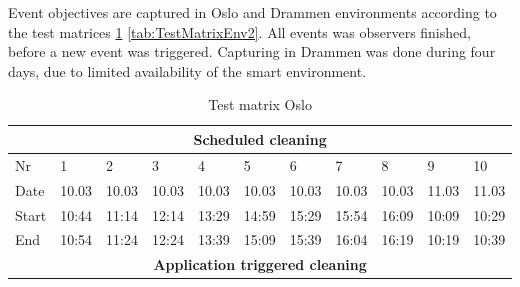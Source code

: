 Event objectives are captured in Oslo and Drammen environments according to the test matrices \ref{tab:TestMatrixEnv1} \ref{tab:TestMatrixEnv2}. All events was observers finished, before a new event was triggered. Capturing in Drammen was done during four days, due to limited availability of the smart environment.  
\begin{table}[H]
\centering
\small
\caption{Test matrix Oslo}
\label{tab:TestMatrixEnv1}
\begin{tabular}{|lllllllllll|}
\hline
\multicolumn{11}{|c|}{\textbf{Scheduled cleaning}}                                                                                                                                                                                                                                                        \\ \hline
\multicolumn{1}{|l|}{Nr} & \multicolumn{1}{l|}{1}     & \multicolumn{1}{l|}{2}     & \multicolumn{1}{l|}{3}     & \multicolumn{1}{l|}{4}     & \multicolumn{1}{l|}{5}     & \multicolumn{1}{l|}{6}     & \multicolumn{1}{l|}{7}     & \multicolumn{1}{l|}{8}     & \multicolumn{1}{l|}{9}     & 10    \\ \hline
\multicolumn{1}{|l|}{Date}   & \multicolumn{1}{l|}{10.03} & \multicolumn{1}{l|}{10.03} & \multicolumn{1}{l|}{10.03} & \multicolumn{1}{l|}{10.03} & \multicolumn{1}{l|}{10.03} & \multicolumn{1}{l|}{10.03} & \multicolumn{1}{l|}{10.03} & \multicolumn{1}{l|}{10.03} & \multicolumn{1}{l|}{11.03} & 11.03 \\ \hline
\multicolumn{1}{|l|}{Start}  & \multicolumn{1}{l|}{10:44} & \multicolumn{1}{l|}{11:14} & \multicolumn{1}{l|}{12:14} & \multicolumn{1}{l|}{13:29} & \multicolumn{1}{l|}{14:59} & \multicolumn{1}{l|}{15:29} & \multicolumn{1}{l|}{15:54} & \multicolumn{1}{l|}{16:09} & \multicolumn{1}{l|}{10:09} & 10:29 \\ \hline
\multicolumn{1}{|l|}{End}    & \multicolumn{1}{l|}{10:54} & \multicolumn{1}{l|}{11:24} & \multicolumn{1}{l|}{12:24} & \multicolumn{1}{l|}{13:39} & \multicolumn{1}{l|}{15:09} & \multicolumn{1}{l|}{15:39} & \multicolumn{1}{l|}{16:04} & \multicolumn{1}{l|}{16:19} & \multicolumn{1}{l|}{10:19} & 10:39 \\ \hline
\multicolumn{11}{|c|}{\textbf{Application triggered cleaning}}                                                                                                                                                                                                                                            \\ \hline

\end{tabular}
\end{table}
